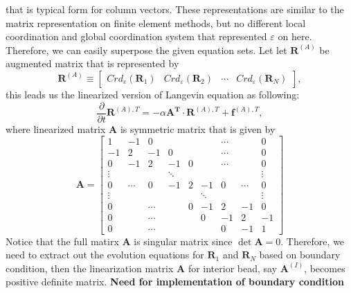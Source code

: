 \documentclass[10pt, a4paper]{article}
\begin{document}
that is typical form for column vectors.
These representations are similar to the matrix representation on finite element methods, but no different local coordination and global coordination system that represented $\varepsilon$ on here. Therefore, we can easily superpose the given equation sets. Let let $\mathbf{R}^{(A)}$ be augmented matrix that is represented by
\begin{equation}
\mathbf{R}^{(A)} \equiv \left[\begin{array}{c|c|c|c}Crd_\varepsilon(\mathbf{R}_1)&Crd_\varepsilon(\mathbf{R}_2)&\cdots&Crd_\varepsilon(\mathbf{R}_N)\end{array}\right],
\end{equation}
this leads us the linearized version of Langevin equation as following:
\begin{equation}
\frac{\partial}{\partial t}\mathbf{R}^{(A),T} = -\alpha\mathbf{A^T}\cdot\mathbf{R}^{(A),T} + \mathbf{f}^{(A),T},
\label{eq:Langevin_discrete_Rouse_linear}
\end{equation}
where linearized matrix $\mathbf{A}$ is symmetric matrix that is given by 
\begin{equation}
\mathbf{A} = \left[\begin{array}{c|ccccccc|c}
    1 & -1 & 0 &  &  &  & \cdots &  & 0 \\ \hline
    -1 & 2 & -1 & 0 &  &  & \cdots & & 0 \\
    0 & -1 & 2 & -1 & 0 &  & \cdots &  & 0 \\
    \vdots & & &\ddots & & & & & \vdots \\
    0 & \cdots & 0 & -1 & 2 & -1 & 0 & \cdots & 0 \\
    \vdots &&&&&\ddots&&&\vdots \\
    0 & & \cdots & & 0 & -1 & 2 & -1 & 0\\
    0 & & \cdots & & & 0 & -1 & 2 & -1\\\hline
    0 & &\cdots&&&& 0 & -1 & 1 
  \end{array}\right]
\end{equation}
Notice that the full matirx $\mathbf{A}$ is singular matrix since $\det\mathbf{A} = 0$. Therefore, we need to extract out the evolution equations for $\mathbf{R}_1$ and $\mathbf{R}_N$ based on boundary condition, then the linearization matrix $\mathbf{A}$ for interior bead, say $\mathbf{A}^{(I)}$, becomes positive definite matrix.
\textbf{Need for implementation of boundary condition}
\end{document}

